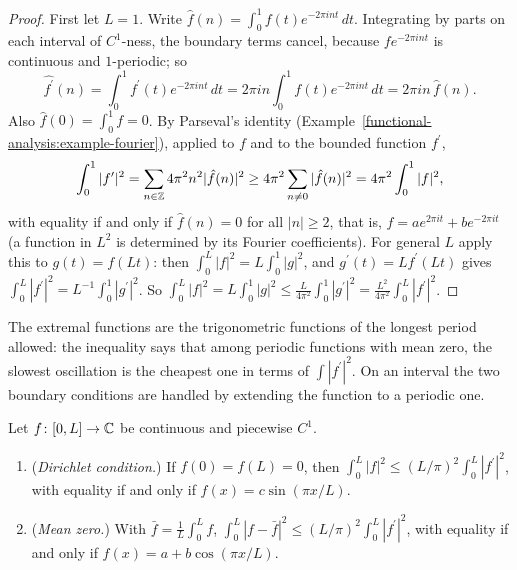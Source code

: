 \begin{proof}
First let $L = 1$. Write $\hat f(n) = \int_0^1f(t)e^{-2\pi int}\,dt$. Integrating by parts on each interval of $C^1$-ness, the boundary terms cancel, because $fe^{-2\pi int}$ is continuous and
$1$-periodic; so
\[
\widehat{f^{\prime}}(n) = \int_0^1f^{\prime}(t)e^{-2\pi int}\,dt = 2\pi in\int_0^1f(t)e^{-2\pi int}\,dt = 2\pi in\,\hat f(n).
\]
Also $\hat f(0) = \int_0^1f = 0$. By Parseval's identity (Example~\ref{functional-analysis:example-fourier}), applied to $f$ and to the bounded function $f^{\prime}$,
\[
\int_0^1|f^{\prime}|^2 = \sum_{n \in \mathbb{Z}}4\pi^2n^2|\hat f(n)|^2 \geq 4\pi^2\sum_{n \neq 0}|\hat f(n)|^2 = 4\pi^2\int_0^1|f|^2,
\]
with equality if and only if $\hat f(n) = 0$ for all $|n| \geq 2$, that is, $f = ae^{2\pi it} + be^{-2\pi it}$ (a function in $L^2$ is determined by its Fourier coefficients). For general $L$ apply
this to $g(t) = f(Lt)$: then $\int_0^L|f|^2 = L\int_0^1|g|^2$, and $g^{\prime}(t) = Lf^{\prime}(Lt)$ gives $\int_0^L|f^{\prime}|^2 = L^{-1}\int_0^1|g^{\prime}|^2$. So
$\int_0^L|f|^2 = L\int_0^1|g|^2 \leq \frac{L}{4\pi^2}\int_0^1|g^{\prime}|^2 = \frac{L^2}{4\pi^2}\int_0^L|f^{\prime}|^2$.
\end{proof}

The extremal functions are the trigonometric functions of the longest period allowed: the inequality says that among periodic functions with mean zero, the slowest oscillation is the cheapest one
in terms of $\int|f^{\prime}|^2$. On an interval the two boundary conditions are handled by extending the function to a periodic one.

\begin{corollary}\label{distributions:corollary-poincare-interval}
Let $f \colon [0, L] \to \mathbb{C}$ be continuous and piecewise $C^1$.
\begin{enumerate}
\item (\emph{Dirichlet condition.}) If $f(0) = f(L) = 0$, then $\int_0^L|f|^2 \leq (L/\pi)^2\int_0^L|f^{\prime}|^2$, with equality if and only if $f(x) = c\sin(\pi x/L)$.
\item (\emph{Mean zero.}) With $\bar f = \frac1L\int_0^Lf$, $\int_0^L|f - \bar f|^2 \leq (L/\pi)^2\int_0^L|f^{\prime}|^2$, with equality if and only if $f(x) = a + b\cos(\pi x/L)$.
\end{enumerate}
\end{corollary}

